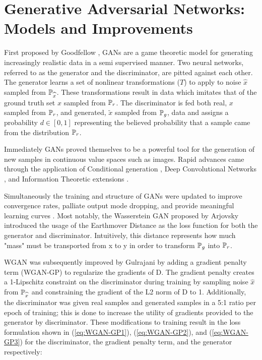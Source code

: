 \section{Generative Adversarial Networks: Models and Improvements}

First proposed by Goodfellow \etal \cite{Goodfellow2014}, GANs are a game theoretic model for generating increasingly realistic data in a semi supervised manner. Two neural networks, referred to as the generator and the discriminator, are pitted against each other. The generator learns a set of nonlinear transformations ($T$) to apply to noise $\widehat{x}$ sampled from $\P_{\widehat{x}}$. These transformations result in data which imitates that of the ground truth set $x$ sampled from $\P_r$. The discriminator is fed both real,  $x$ sampled from $\P_r$, and generated, $\widetilde{x}$ sampled from $\P_g$, data and assigns a probability $d \in [0,1]$ representing the believed probability that a sample came from the distribution $\P_r$. 

Immediately GANs proved themselves to be a powerful tool for the generation of new samples in continuous value spaces such as images. Rapid advances came through the application of Conditional generation \cite{Mirza2014}, Deep Convolutional Networks \cite{Radford2015}, and Information Theoretic extensions \cite{Chen2016}. 

Simultaneously the training and structure of GANs were updated to improve convergence rates, palliate output mode dropping, and provide meaningful learning curves \cite{Salimans, Arjovsky2017, Gulrajani2017}. Most notably, the Wasserstein GAN proposed by Arjovsky \etal \cite{Arjovsky2017} introduced the usage of the Earthmover Distance as the loss function for both the generator and discriminator. Intuitively, this distance represents how much "mass" must be transported from x to y in order to transform $\P_g$ into $\P_r$. 

WGAN was subsequently improved by Gulrajani \etal \cite{Gulrajani2017} by adding a gradient penalty term (WGAN-GP) to regularize the gradients of D. The gradient penalty creates a 1-Lipschitz constraint on the discriminator during training by sampling noise $\widehat{x}$ from $\P_{\widehat{x}}$ and constraining the gradient of the L2 norm of D to 1. Additionally, the discriminator was given real samples and generated samples in a 5:1 ratio per epoch of training; this is done to increase the utility of gradients provided to the generator by discriminator. These modifications to training result in the loss formulation shown in (\ref{eq:WGAN-GP1}), (\ref{eq:WGAN-GP2}), and (\ref{eq:WGAN-GP3}) for the discriminator, the gradient penalty term, and the generator respectively:

